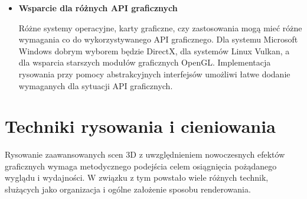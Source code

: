 \begin{itemize}
	\item \textbf{Wsparcie dla różnych API graficznych}
	
	Różne systemy operacyjne, karty graficzne, czy zastosowania mogą mieć różne wymagania co do wykorzystywanego API graficznego. Dla systemu Microsoft Windows dobrym wyborem będzie DirectX, dla systemów Linux Vulkan, a dla wsparcia starszych modułów graficznych OpenGL. Implementacja rysowania przy pomocy abstrakcyjnych interfejsów umożliwi łatwe dodanie wymaganych dla sytuacji API graficznych.
\end{itemize}

\section{Techniki rysowania i cieniowania}

Rysowanie zaawansowanych scen 3D z uwzględnieniem nowoczesnych efektów graficznych wymaga metodycznego podejścia celem osiągnięcia pożądanego wyglądu i wydajności. W związku z tym powstało wiele różnych technik, służących jako organizacja i ogólne założenie sposobu renderowania.

